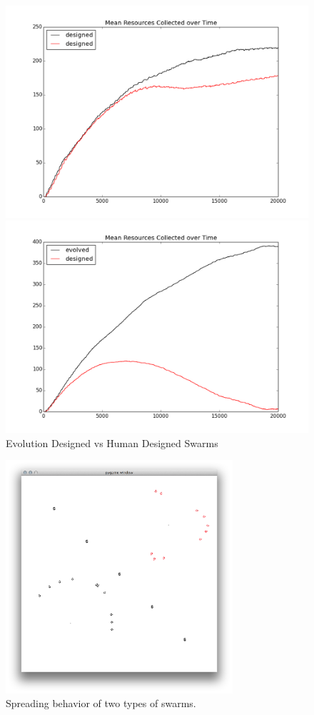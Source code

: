 \documentclass[letter]{article}
\begin{document}
\begin{figure}
\centering
\begin{minipage}{0.5\textwidth}
	\centering
    	\includegraphics[width=\textwidth]{figures/designed_v_designed}
\end{minipage}%
\begin{minipage}{0.5\textwidth}
	\centering
    	\includegraphics[width=\textwidth]{figures/evolved_v_designed}
\end{minipage}
	\caption{\label{fig:head2head}Evolution Designed vs Human Designed Swarms}
\end{figure}

\begin{figure}
	\centering
    	\includegraphics[width=0.75\textwidth]{figures/spreading}
    \caption{\label{fig:spreading}Spreading behavior of two types of swarms.}
\end{figure}
\end{document}

